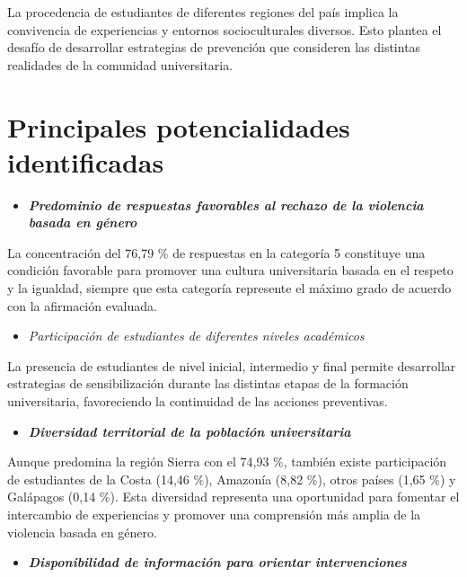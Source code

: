 \documentclass[
  spanish,
  11pt,
  letterpaper,
  DIV=11,
  numbers=noendperiod]{scrreprt}
\providecommand{\tightlist}{%
  \setlength{\itemsep}{0pt}\setlength{\parskip}{0pt}}
\begin{document}
La procedencia de estudiantes de diferentes regiones del país implica la
convivencia de experiencias y entornos socioculturales diversos. Esto
plantea el desafío de desarrollar estrategias de prevención que
consideren las distintas realidades de la comunidad universitaria.

\section{Principales potencialidades
identificadas}\label{principales-potencialidades-identificadas}

\begin{itemize}
\tightlist
\item
  \textbf{\emph{Predominio de respuestas favorables al rechazo de la
  violencia basada en género}}
\end{itemize}

La concentración del 76,79 \% de respuestas en la categoría 5 constituye
una condición favorable para promover una cultura universitaria basada
en el respeto y la igualdad, siempre que esta categoría represente el
máximo grado de acuerdo con la afirmación evaluada.

\begin{itemize}
\tightlist
\item
  \emph{Participación de estudiantes de diferentes niveles académicos}
\end{itemize}

La presencia de estudiantes de nivel inicial, intermedio y final permite
desarrollar estrategias de sensibilización durante las distintas etapas
de la formación universitaria, favoreciendo la continuidad de las
acciones preventivas.

\begin{itemize}
\tightlist
\item
  \textbf{\emph{Diversidad territorial de la población universitaria}}
\end{itemize}

Aunque predomina la región Sierra con el 74,93 \%, también existe
participación de estudiantes de la Costa (14,46 \%), Amazonía (8,82 \%),
otros países (1,65 \%) y Galápagos (0,14 \%). Esta diversidad representa
una oportunidad para fomentar el intercambio de experiencias y promover
una comprensión más amplia de la violencia basada en género.

\begin{itemize}
\tightlist
\item
  \textbf{\emph{Disponibilidad de información para orientar
  intervenciones}}
\end{itemize}
\end{document}
